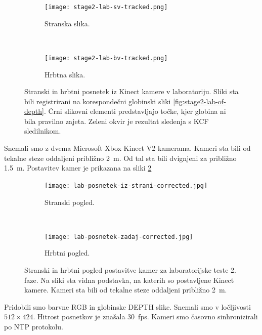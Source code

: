 \begin{figure}[!htb]
	\centering
	\begin{subfigure}{0.45\columnwidth}
		\texttt{[image: stage2-lab-sv-tracked.png]}
		\caption{Stranska slika.}
	\end{subfigure}
	~
	\begin{subfigure}{0.45\columnwidth}
		\texttt{[image: stage2-lab-bv-tracked.png]}
		\caption{Hrbtna slika.}
	\end{subfigure}
	\caption[Stranski in hrbtni posnetek iz Kinect kamere v laboratoriju]{Stranski in hrbtni posnetek iz Kinect kamere v laboratoriju. Sliki sta bili registrirani na korespondečni globinski sliki \ref{fig:stage2-lab-of-depth}. Črni slikovni elementi predstavljajo točke, kjer globina ni bila pravilno zajeta. Zeleni okvir je rezultat sledenja s KCF sledilnikom.}
	\label{fig:primer-posnetka-stage2}
\end{figure}

Snemali smo z dvema Microsoft Xbox Kinect V2 kamerama. Kameri sta bili od tekalne steze oddaljeni približno \SI{2}{m}. Od tal sta bili dvignjeni za približno \SI{1.5}{m}. Postavitev kamer je prikazana na sliki \ref{fig:lab-postavitev-kamer}

\begin{figure}[!htb]
	\centering
	\begin{subfigure}[t]{0.45\columnwidth}
		\texttt{[image: lab-posnetek-iz-strani-corrected.jpg]}
		\caption{Stranski pogled.}
	\end{subfigure}
	~
	\begin{subfigure}[t]{0.45\columnwidth}
		\texttt{[image: lab-posnetek-zadaj-corrected.jpg]}
		\caption{Hrbtni pogled.}
	\end{subfigure}
	\caption[Stranski in hrbtni pogled postavitve kamer za laboratorijske teste 2. faze]{Stranski in hrbtni pogled postavitve kamer za laboratorijske teste 2. faze. Na sliki sta vidna podstavka, na katerih so postavljene Kinect kamere. Kameri sta bili od tekalne steze oddaljeni približno \SI{2}{m}.}
	\label{fig:lab-postavitev-kamer}
\end{figure}


Pridobili smo barvne RGB in globinske DEPTH slike. Snemali smo v ločljivosti $512 \times 424$. Hitrost posnetkov je znašala \SI{30}{fps}. Kameri smo časovno sinhronizirali po NTP protokolu.


